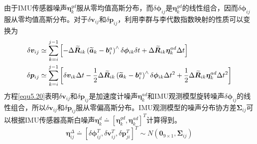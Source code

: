 由于IMU传感器噪声$\boldsymbol{\eta}_k^{gd}$服从零均值高斯分布，而$\delta \boldsymbol{\phi}_{ij}$是$\boldsymbol{\eta}_k^{gd}$的线性组合，因而$\delta \boldsymbol{\phi}_{ij}$服从零均值高斯分布。对于$\delta \boldsymbol{v}_{ij}$和$\delta \boldsymbol{p}_{ij}$，利用李群与李代数指数映射的性质可以变换为
\begin{equation}
\label{equ5.20}
\begin{aligned}
\delta \boldsymbol{v}_{ij} &\simeq \sum\limits_{k=i}^{j-1} \left[ - \Delta \widetilde{\boldsymbol{R}}_{ik} \left( \widetilde{\boldsymbol{a}}_k - \boldsymbol{b}_i^a  \right) ^{\wedge} \delta \boldsymbol{\phi}_{ik} \delta t + \Delta \widetilde{\boldsymbol{R}}_{ik} \boldsymbol{\eta}_k^{ad} \Delta t   \right] 
\\ 
\delta \boldsymbol{p}_{ij} &\simeq \sum\limits_{k=i}^{j-1} \left[ \delta \boldsymbol{v}_{ik} \Delta t -{1 \over 2} \Delta \widetilde{\boldsymbol{R}}_{ik} \left( \widetilde{\boldsymbol{a}}_k - \boldsymbol{b}_i^a  \right) ^{\wedge} \delta \boldsymbol{\phi}_{ik} \Delta t^2 + { 1 \over 2} \Delta \widetilde{\boldsymbol{R}}_{ik} \boldsymbol{\eta}_k^{ad} \Delta t^2 \right]
\end{aligned}
\end{equation}
方程\eqref{equ5.20}表明$\delta \boldsymbol{v}_{ij}$和$\delta \boldsymbol{p}_{ij}$是加速度计噪声$\boldsymbol{\eta}_k^{ad}$和IMU观测模型旋转噪声$\delta \boldsymbol{\phi}_{ij}$的线性组合，所以$\delta \boldsymbol{v}_{ij}$和$\delta \boldsymbol{p}_{ij}$服从零偏高斯分布。IMU观测模型的噪声分布协方差$\boldsymbol{\Sigma}_{ij}$可以根据IMU传感器高斯白噪声$\boldsymbol{\eta}_k^d \doteq [\boldsymbol{\eta}_k^{gd}, \boldsymbol{\eta}_k^{ad}]^T$计算得到。
\begin{equation}
\label{equ5.21}
\boldsymbol{\eta}_{ij}^{\Delta} \doteq \left[ \delta \boldsymbol{\phi}_{ij}^T, \delta \boldsymbol{v}_{ij}^T, \delta \boldsymbol{p}_{ji}^T \right]^T \sim N \left( \boldsymbol{0}_{9 \times 1}, \boldsymbol{\Sigma}_{ij}  \right)
\end{equation}


